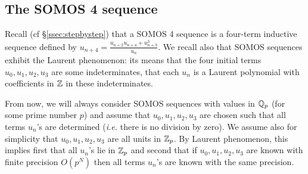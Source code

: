 \documentclass{amsart}
\begin{document}
\subsection{The SOMOS 4 sequence}
\label{ssec:SOMOS-solution}

Recall (cf \S \ref{ssec:stepbystep}) that a SOMOS 4 sequence is a 
four-term inductive sequence defined by $u_{n+4} = \frac{u_{n+2} u_{n+4} 
+ u_{n+3}^3}{u_n}$. We recall also that SOMOS sequences exhibit the 
Laurent phenomenon: its means that the four initial terms $u_0, u_1, 
u_2, u_3$ are some indeterminates, that each $u_n$ is a Laurent 
polynomial with coefficients in $\mathbb Z$ in these indeterminates.

From now, we will always consider SOMOS sequences with values in $\mathbb Q_p$ 
(for some prime number $p$) and assume that $u_0, u_1, u_2, u_3$ are 
chosen such that all terms $u_n$'s are determined (\emph{i.e.} there is 
no division by zero). We assume also for simplicity that $u_0, u_1, u_2, 
u_3$ are all units in $\mathbb Z_p$. By Laurent phenomenon, this implies first 
that all $u_n$'s lie in $\mathbb Z_p$ and second that if $u_0, u_1, u_2, u_3$ 
are known with finite precision $O(p^N)$ then all terms $u_n$'s are 
known with the same precision. 
\end{document}
